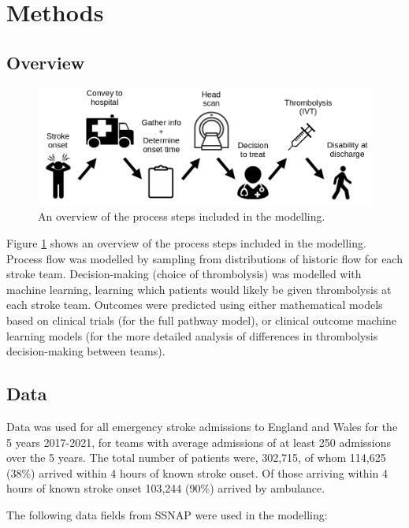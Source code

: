 \section{Methods}

\subsection{Overview}

\begin{figure}
    \centering
    \includegraphics[width=0.75\linewidth]{images/flow}
    \caption{An overview of the process steps included in the modelling.}
    \label{fig:flow}
\end{figure}

Figure \ref{fig:flow} shows an overview of the process steps included in the modelling. Process flow was modelled by sampling from distributions of historic flow for each stroke team. Decision-making (choice of thrombolysis) was modelled with machine learning, learning which patients would likely be given thrombolysis at each stroke team. Outcomes were predicted using either mathematical models based on clinical trials (for the full pathway model), or clinical outcome machine learning models (for the more detailed analysis of differences in thrombolysis decision-making between teams).


\subsection{Data}

Data was used for all emergency stroke admissions to England and Wales for the 5 years 2017-2021, for teams with average admissions of at least 250 admissions over the 5 years. The total number of patients were, 302,715, of whom 114,625 (38\%) arrived within 4 hours of known stroke onset. Of those arriving within 4 hours of known stroke onset 103,244 (90\%) arrived by ambulance.

The following data fields from SSNAP were used in the modelling:

